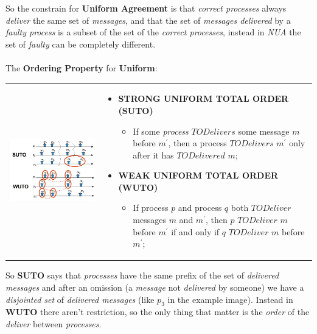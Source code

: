\documentclass{article}
\begin{document}
So the constrain for\textbf{ Uniform Agreement} is that \emph{correct processes} always \emph{deliver} the same set of \emph{messages}, and that the set of \emph{messages delivered} by a \emph{faulty process} is a subset of the set of the \emph{correct processes}, instead in \emph{NUA} the set of \emph{faulty} can be completely different.\\\\
The \textbf{Ordering Property} for \textbf{Uniform}:\\
\begin{tabular}{C{5cm}  L{10.5cm}}
        \includegraphics[scale=0.95]{cattura57.png} &
\begin{itemize}
\item \textbf{STRONG UNIFORM TOTAL ORDER (SUTO)}
\begin{itemize}
\item If some \emph{process} $TODelivers$ some message $m$ before $m^{'}$, then a process $TODelivers$ $m^{'}$ only after it has $TODelivered$ $m$;
\end{itemize}
\item \textbf{WEAK UNIFORM TOTAL ORDER (WUTO)}
\begin{itemize}
\item If process $p$ and process $q$ both $TODeliver$ messages $m$ and $m^{'}$, then $p$ $TODeliver$ $m$ before $m^{'}$ if and only if $q$ $TODeliver$ $m$ before $m^{'}$;
\end{itemize}
\end{itemize}
\end{tabular}
So \textbf{SUTO} says that \emph{processes} have the same prefix of the set of \emph{delivered messages} and after an omission (a \emph{message} not \emph{delivered} by someone) we have a \emph{disjointed set} of \emph{delivered messages} (like $p_3$ in the example image). Instead in \textbf{WUTO} there aren't restriction, so the only thing that matter is the \emph{order} of the \emph{deliver} between \emph{processes}. \\\\
\end{document}
